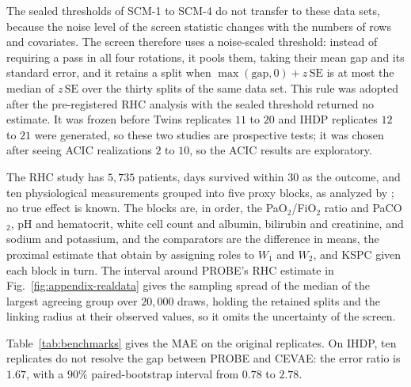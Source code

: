 The sealed thresholds of SCM-1 to SCM-4 do not transfer to these data sets, because the noise level of the screen statistic changes with the numbers of rows and covariates. The screen therefore uses a noise-scaled threshold: instead of requiring a pass in all four rotations, it pools them, taking their mean gap and its standard error, and it retains a split when $\max(\mathrm{gap},0)+z\,\mathrm{SE}$ is at most the median of $z\,\mathrm{SE}$ over the thirty splits of the same data set. This rule was adopted after the pre-registered RHC analysis with the sealed threshold returned no estimate. It was frozen before Twins replicates $11$ to $20$ and IHDP replicates $12$ to $21$ were generated, so these two studies are prospective tests; it was chosen after seeing ACIC realizations $2$ to $10$, so the ACIC results are exploratory.

The RHC study \citep{connors1996effectiveness} has $5{,}735$ patients, days survived within $30$ as the outcome, and ten physiological measurements grouped into five proxy blocks, as analyzed by \citet{cui2024semiparametric}; no true effect is known. The blocks are, in order, the PaO$_2$/FiO$_2$ ratio and PaCO$_2$, pH and hematocrit, white cell count and albumin, bilirubin and creatinine, and sodium and potassium, and the comparators are the difference in means, the proximal estimate that \citet{cui2024semiparametric} obtain by assigning roles to $W_1$ and $W_2$, and KSPC given each block in turn. The interval around PROBE's RHC estimate in Fig.~\ref{fig:appendix-realdata} gives the sampling spread of the median of the largest agreeing group over $20{,}000$ draws, holding the retained splits and the linking radius at their observed values, so it omits the uncertainty of the screen.

Table~\ref{tab:benchmarks} gives the MAE on the original replicates. On IHDP, ten replicates do not resolve the gap between PROBE and CEVAE: the error ratio is $1.67$, with a $90\%$ paired-bootstrap interval from $0.78$ to $2.78$. 

